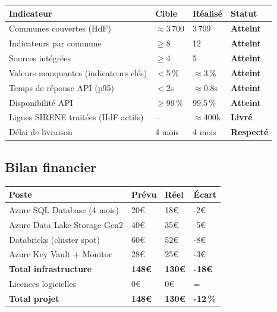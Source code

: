\documentclass[11pt,a4paper]{article}
\begin{document}
\begin{tabular}{L{6cm} C{2.5cm} C{2.5cm} L{2.5cm}}
  \toprule
  \textbf{Indicateur} & \textbf{Cible} & \textbf{Réalisé} & \textbf{Statut} \\
  \midrule
  Communes couvertes (HdF) & $\approx$3\,700 & 3\,709 & \textcolor{successgreen}{\textbf{Atteint}} \\
  Indicateurs par commune & $\geq$8 & 12 & \textcolor{successgreen}{\textbf{Atteint}} \\
  Sources intégrées & $\geq$4 & 5 & \textcolor{successgreen}{\textbf{Atteint}} \\
  Valeurs manquantes (indicateurs clés) & $<$5\,\% & $\approx$3\,\% & \textcolor{successgreen}{\textbf{Atteint}} \\
  Temps de réponse API (p95) & $<$2s & $\approx$0.8s & \textcolor{successgreen}{\textbf{Atteint}} \\
  Disponibilité API & $\geq$99\,\% & 99.5\,\% & \textcolor{successgreen}{\textbf{Atteint}} \\
  Lignes SIRENE traitées (HdF actifs) & -- & $\approx$400k & \textcolor{successgreen}{\textbf{Livré}} \\
  Délai de livraison & 4 mois & 4 mois & \textcolor{successgreen}{\textbf{Respecté}} \\
  \bottomrule
\end{tabular}

\subsection{Bilan financier}

\begin{tabular}{L{5.5cm} C{2.5cm} C{2.5cm} L{2.5cm}}
  \toprule
  \textbf{Poste} & \textbf{Prévu} & \textbf{Réel} & \textbf{Écart} \\
  \midrule
  Azure SQL Database (4 mois) & 20€ & 18€ & -2€ \\
  Azure Data Lake Storage Gen2 & 40€ & 35€ & -5€ \\
  Databricks (cluster spot) & 60€ & 52€ & -8€ \\
  Azure Key Vault + Monitor & 28€ & 25€ & -3€ \\
  \midrule
  \textbf{Total infrastructure} & \textbf{148€} & \textbf{130€} & \textbf{-18€} \\
  Licences logicielles & 0€ & 0€ & = \\
  \textbf{Total projet} & \textbf{148€} & \textbf{130€} & \textbf{-12\,\%} \\
  \bottomrule
\end{tabular}
\end{document}
